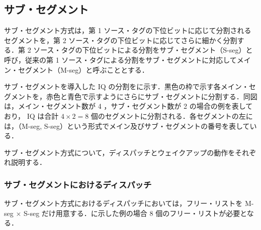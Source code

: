 \subsection{サブ・セグメント}
\label{sec:sub_segment}
サブ・セグメント方式は，第 1 ソース・タグの下位ビットに応じて分割されるセグメントを，第 2 ソース・タグの下位ビットに応じてさらに細かく分割する．第 2 ソース・タグの下位ビットによる分割をサブ・セグメント（S-seg）と呼び，従来の第 1 ソース・タグによる分割をサブ・セグメントに対応してメイン・セグメント（M-seg）と呼ぶこととする．

サブ・セグメントを導入した IQ の分割をに示す．黒色の枠で示す各メイン・セグメントを，赤色と青色で示すようにさらにサブ・セグメントに分割する．同図は，メイン・セグメント数が 4 ，サブ・セグメント数が 2 の場合の例を表しており， IQ は合計 $4 \times 2 = 8$ 個のセグメントに分割される．各セグメントの左には，（M-seg, S-seg）という形式でメイン及びサブ・セグメントの番号を表している．

サブ・セグメント方式について，ディスパッチとウェイクアップの動作をそれぞれ説明する．

\subsubsection{サブ・セグメントにおけるディスパッチ}
サブ・セグメント方式におけるディスパッチにおいては，フリー・リストを M-seg $\times$ S-seg だけ用意する．に示した例の場合 8 個のフリー・リストが必要となる．

